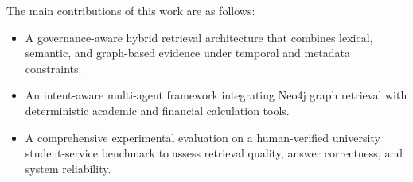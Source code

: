 The main contributions of this work are as follows:
\begin{itemize}
    \item A governance-aware hybrid retrieval architecture that combines lexical, semantic, and graph-based evidence under temporal and metadata constraints.
    \item An intent-aware multi-agent framework integrating Neo4j graph retrieval with deterministic academic and financial calculation tools.
    \item A comprehensive experimental evaluation on a human-verified university student-service benchmark to assess retrieval quality, answer correctness, and system reliability.
\end{itemize}